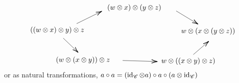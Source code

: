 \begin{definition}
\begin{enumerate}
\[\begin{tikzpicture}[x=0.75pt,y=0.75pt,yscale=-1,xscale=1]
\draw    (162,295.1) -- (207.41,272.69) ;
\draw [shift={(209.2,271.8)}, rotate = 153.73] [color={rgb, 255:red, 0; green, 0; blue, 0 }  ][line width=0.75]    (10.93,-3.29) .. controls (6.95,-1.4) and (3.31,-0.3) .. (0,0) .. controls (3.31,0.3) and (6.95,1.4) .. (10.93,3.29)   ;
\draw    (348,271.2) -- (387.29,295.06) ;
\draw [shift={(389,296.1)}, rotate = 211.27] [color={rgb, 255:red, 0; green, 0; blue, 0 }  ][line width=0.75]    (10.93,-3.29) .. controls (6.95,-1.4) and (3.31,-0.3) .. (0,0) .. controls (3.31,0.3) and (6.95,1.4) .. (10.93,3.29)   ;
\draw    (137,322.2) -- (163.56,347.71) ;
\draw [shift={(165,349.1)}, rotate = 223.85] [color={rgb, 255:red, 0; green, 0; blue, 0 }  ][line width=0.75]    (10.93,-3.29) .. controls (6.95,-1.4) and (3.31,-0.3) .. (0,0) .. controls (3.31,0.3) and (6.95,1.4) .. (10.93,3.29)   ;
\draw    (248,364.1) -- (311,366.04) ;
\draw [shift={(313,366.1)}, rotate = 181.76] [color={rgb, 255:red, 0; green, 0; blue, 0 }  ][line width=0.75]    (10.93,-3.29) .. controls (6.95,-1.4) and (3.31,-0.3) .. (0,0) .. controls (3.31,0.3) and (6.95,1.4) .. (10.93,3.29)   ;
\draw    (380,353.1) -- (407.49,329.41) ;
\draw [shift={(409,328.1)}, rotate = 139.24] [color={rgb, 255:red, 0; green, 0; blue, 0 }  ][line width=0.75]    (10.93,-3.29) .. controls (6.95,-1.4) and (3.31,-0.3) .. (0,0) .. controls (3.31,0.3) and (6.95,1.4) .. (10.93,3.29)   ;

\draw (74,299.4) node [anchor=north west][inner sep=0.75pt]    {$(( w\otimes x) \otimes y) \otimes z$};
\draw (218,257.4) node [anchor=north west][inner sep=0.75pt]    {$( w\otimes x) \otimes ( y\otimes z)$};
\draw (356,301.4) node [anchor=north west][inner sep=0.75pt]    {$w\otimes ( x\otimes ( y\otimes z))$};
\draw (122,355.4) node [anchor=north west][inner sep=0.75pt]    {$( w\otimes ( x\otimes y)) \otimes z$};
\draw (319,357.4) node [anchor=north west][inner sep=0.75pt]    {$w\otimes (( x\otimes y) \otimes z)$};


\end{tikzpicture}
\]
	or as natural transformations, $a\circ a=(\operatorname{\mathrm{id}}_{\mathscr{C}}\otimes a)\circ a\circ(a\otimes\operatorname{\mathrm{id}}_{\mathscr{C}})$
	\end{enumerate}
\end{definition}
